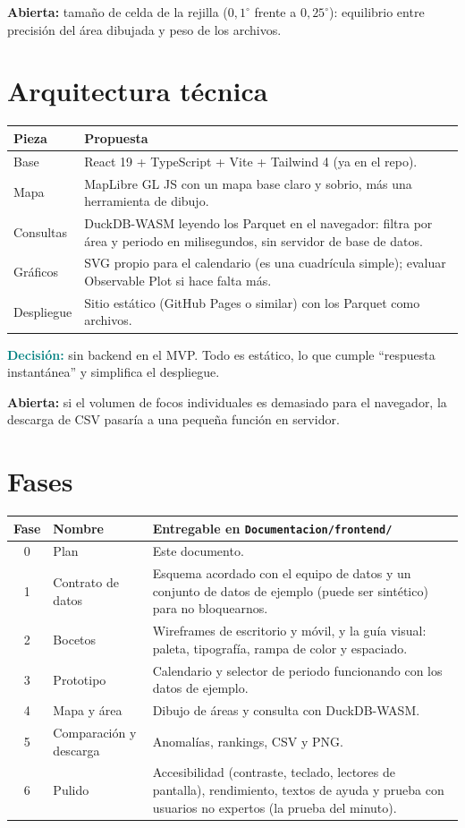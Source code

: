 \documentclass[11pt,a4paper]{article}
\newcommand{\decision}[1]{\textcolor{teal}{\textbf{Decisión:}} #1}
\newcommand{\abierta}[1]{\textcolor{orange!80!black}{\textbf{Abierta:}} #1}
\begin{document}
\abierta{tamaño de celda de la rejilla ($0{,}1^\circ$ frente a $0{,}25^\circ$): equilibrio
entre precisión del área dibujada y peso de los archivos.}

\section{Arquitectura técnica}

\begin{tabularx}{\linewidth}{@{}lX@{}}
\toprule
Pieza & Propuesta \\
\midrule
Base & React 19 + TypeScript + Vite + Tailwind 4 (ya en el repo). \\
Mapa & MapLibre GL JS con un mapa base claro y sobrio, más una herramienta de dibujo. \\
Consultas & DuckDB-WASM leyendo los Parquet en el navegador: filtra por área y periodo
  en milisegundos, sin servidor de base de datos. \\
Gráficos & SVG propio para el calendario (es una cuadrícula simple); evaluar
  Observable Plot si hace falta más. \\
Despliegue & Sitio estático (GitHub Pages o similar) con los Parquet como archivos. \\
\bottomrule
\end{tabularx}

\decision{sin backend en el MVP. Todo es estático, lo que cumple ``respuesta instantánea''
y simplifica el despliegue.}

\abierta{si el volumen de focos individuales es demasiado para el navegador, la descarga
de CSV pasaría a una pequeña función en servidor.}

\section{Fases}\label{sec:fases}

\begin{tabularx}{\linewidth}{@{}clX@{}}
\toprule
Fase & Nombre & Entregable en \texttt{Documentacion/frontend/} \\
\midrule
0 & Plan & Este documento. \\
1 & Contrato de datos & Esquema acordado con el equipo de datos y un conjunto de
  datos de ejemplo (puede ser sintético) para no bloquearnos. \\
2 & Bocetos & Wireframes de escritorio y móvil, y la guía visual: paleta, tipografía,
  rampa de color y espaciado. \\
3 & Prototipo & Calendario y selector de periodo funcionando con los datos de ejemplo. \\
4 & Mapa y área & Dibujo de áreas y consulta con DuckDB-WASM. \\
5 & Comparación y descarga & Anomalías, rankings, CSV y PNG. \\
6 & Pulido & Accesibilidad (contraste, teclado, lectores de pantalla), rendimiento,
  textos de ayuda y prueba con usuarios no expertos (la prueba del minuto). \\
\bottomrule
\end{tabularx}
\end{document}
